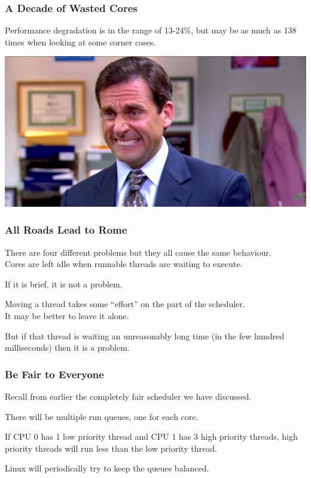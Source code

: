\begin{frame}
\frametitle{A Decade of Wasted Cores}

Performance degradation is in the range of 13-24\%, but may be as much as 138 times when looking at some corner cases. 

\begin{center}
	\includegraphics[width=\textwidth]{images/yikes.jpg}
\end{center}



\end{frame}



\begin{frame}
\frametitle{All Roads Lead to Rome}

There are four different problems but they all cause the same behaviour. \\
\quad Cores are left idle when runnable threads are waiting to execute. 

If it is brief, it is not a problem.

Moving a thread takes some ``effort'' on the part of the scheduler.\\
\quad It may be better to leave it alone. 

But if that thread is waiting an unreasonably long time (in the few hundred milliseconds) then it is a problem.

\end{frame}



\begin{frame}
\frametitle{Be Fair to Everyone}

Recall from earlier the completely fair scheduler we have discussed. 

There will be multiple run queues, one for each core. 

If CPU 0 has 1 low priority thread and CPU 1 has 3 high priority threads, high priority threads will run less than the low priority thread. 

Linux will periodically try to keep the queues balanced.

\end{frame}



